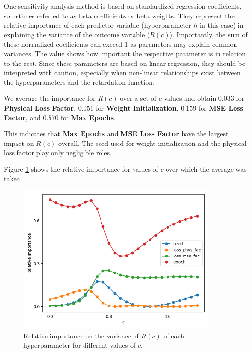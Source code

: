 \documentclass{article}
\begin{document}
One sensitivity analysis method is based on standardized regression coefficients, sometimes referred to as beta coefficients or beta weights. They represent the relative importance of each predictor variable (hyperparameter $h$ in this case) in explaining the variance of the outcome variable ($R(c)$).
Importantly, the sum of these normalized coefficients can exceed 1 as parameters may explain common variances. The value shows how important the respective parameter is in relation to the rest.
Since these parameters are based on linear regression, they should be interpreted with caution, especially when non-linear relationships exist between the hyperparameters and the retardation function.

We average the importance for $R(c)$ over a set of $c$ values and obtain $0.033$ for \textbf{Physical Loss Factor}, $0.051$ for \textbf{Weight Initialization}, $0.159$ for \textbf{MSE Loss Factor}, and $0.570$ for \textbf{Max Epochs}.

This indicates that \textbf{Max Epochs} and \textbf{MSE Loss Factor} have the largest impact on $R(c)$ overall. The seed used for weight initialization and the physical loss factor play only negligible roles.

Figure \ref{fig:sensitivity} shows the relative importance for values of $c$ over which the average was taken.


\begin{figure}
    \centering
    \includegraphics[width=0.9\textwidth]{figs/sensitivity.png}
    \caption{Relative importance on the variance of $R(c)$ of each hyperparameter for different values of $c$.}
    \label{fig:sensitivity}
\end{figure}
\end{document}
